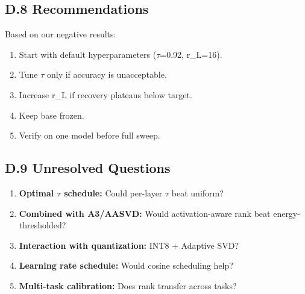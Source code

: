 \subsection{D.8 Recommendations}

Based on our negative results:

\begin{enumerate}
\item Start with default hyperparameters ($\tau$=0.92, r\_L=16).
\item Tune $\tau$ only if accuracy is unacceptable.
\item Increase r\_L if recovery plateaus below target.
\item Keep base frozen.
\item Verify on one model before full sweep.

\end{enumerate}
\subsection{D.9 Unresolved Questions}

\begin{enumerate}
\item \textbf{Optimal $\tau$ schedule:} Could per-layer $\tau$ beat uniform?
\item \textbf{Combined with A3/AASVD:} Would activation-aware rank beat
  energy-thresholded?
\item \textbf{Interaction with quantization:} INT8 + Adaptive SVD?
\item \textbf{Learning rate schedule:} Would cosine scheduling help?
\item \textbf{Multi-task calibration:} Does rank transfer across tasks?
\end{enumerate}